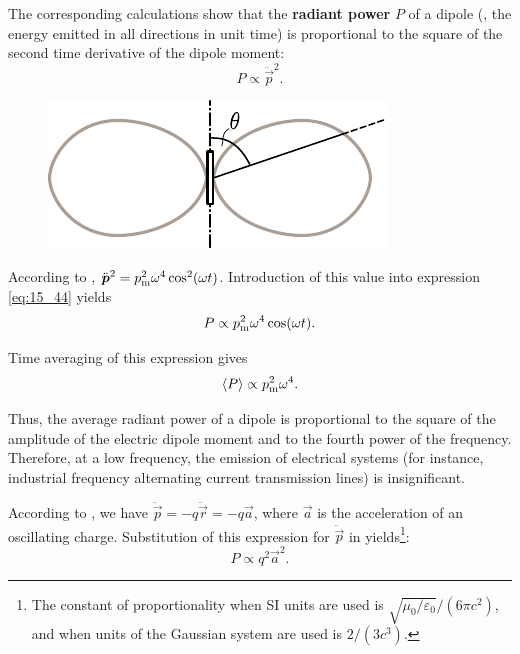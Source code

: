 The corresponding calculations show that the \textbf{radiant power} $P$ of a dipole (\ie, the energy emitted in all directions in unit time) is
proportional to the square of the second time derivative of the dipole moment:
\begin{equation}\label{eq:15_44}
    P \propto \ddot{\vec{p}}^2.
\end{equation}

\begin{figure}[t]
	\begin{center}
		\includegraphics[scale=1]{figures/ch_15/fig_15_7.pdf}
		\caption[]{}
		\label{fig:15_7}
	\end{center}
	\vspace{-0.8cm}
\end{figure}

\noindent
According to , $\ddot{\boldsymbol{p}}^2=p_{\text{m}}^2\omega^4\cos^2(\omega t)$.
Introduction of this value into expression \eqref{eq:15_44} yields
\begin{equation}\label{eq:15_45}
    P \propto p_{\text{m}}^2 \omega^4 \cos(\omega t).
\end{equation}

\noindent
Time averaging of this expression gives
\begin{equation}\label{eq:15_46}
    \left\langle P \right\rangle \propto p_{\text{m}}^2 \omega^4.
\end{equation}

\noindent
Thus, the average radiant power of a dipole is proportional to the square of the amplitude of the electric dipole moment and to the fourth power of the frequency.
Therefore, at a low frequency, the emission of electrical systems (for instance, industrial frequency alternating current transmission lines) is insignificant.

According to , we have $\ddot{\vec{p}}=-q\ddot{\vec{r}}=-q\vec{a}$, where $\vec{a}$ is the acceleration of an oscillating charge.
Substitution of this expression for $\ddot{\vec{p}}$ in  yields\footnote{The constant of proportionality when SI units are used is $\sqrt{\mu_0/\varepsilon_0}/(6\pi c^2)$, and when units of the Gaussian system are used is $2/(3c^3)$.}:
\begin{equation}\label{eq:15_47}
    P \propto q^2 \vec{a}^2.
\end{equation}


